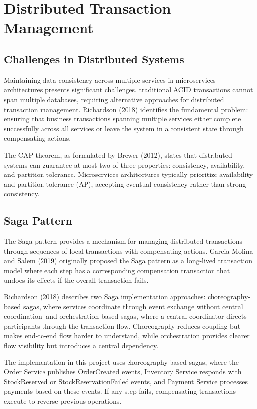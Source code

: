 \section{Distributed Transaction Management}

\subsection{Challenges in Distributed Systems}

Maintaining data consistency across multiple services in microservices architectures presents significant challenges. traditional ACID transactions cannot span multiple databases, requiring alternative approaches for distributed transaction management. Richardson (2018) identifies the fundamental problem: ensuring that business transactions spanning multiple services either complete successfully across all services or leave the system in a consistent state through compensating actions.

The CAP theorem, as formulated by Brewer (2012), states that distributed systems can guarantee at most two of three properties: consistency, availability, and partition tolerance. Microservices architectures typically prioritize availability and partition tolerance (AP), accepting eventual consistency rather than strong consistency.

\subsection{Saga Pattern}

The Saga pattern provides a mechanism for managing distributed transactions through sequences of local transactions with compensating actions. Garcia-Molina and Salem (2019) originally proposed the Saga pattern as a long-lived transaction model where each step has a corresponding compensation transaction that undoes its effects if the overall transaction fails.

Richardson (2018) describes two Saga implementation approaches: choreography-based sagas, where services coordinate through event exchange without central coordination, and orchestration-based sagas, where a central coordinator directs participants through the transaction flow. Choreography reduces coupling but makes end-to-end flow harder to understand, while orchestration provides clearer flow visibility but introduces a central dependency.

The implementation in this project uses choreography-based sagas, where the Order Service publishes OrderCreated events, Inventory Service responds with StockReserved or StockReservationFailed events, and Payment Service processes payments based on these events. If any step fails, compensating transactions execute to reverse previous operations.

